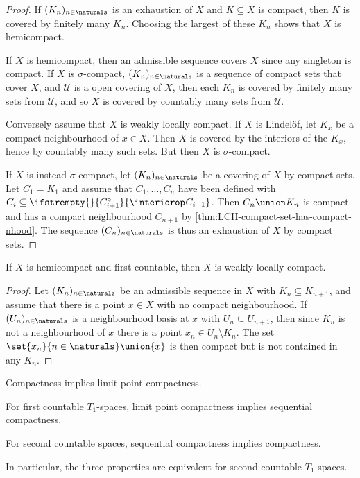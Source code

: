 \documentclass[article, a4paper, 11pt, oneside]{memoir}
\numberwithin{equation}{chapter}
\newcommand{\calU}{\mathcal{U}}
\renewcommand\interior[2][]{%
    \ifstrempty{#1}{%
        #2^{\circ}
    }{%
        \interiorop_{#1}#2
    }%
}
\begin{document}
\begin{proof}
    If $(K_n)_{n \in \naturals}$ is an exhaustion of $X$ and $K \subseteq X$ is compact, then $K$ is covered by finitely many $K_n$. Choosing the largest of these $K_n$ shows that $X$ is hemicompact.

    If $X$ is hemicompact, then an admissible sequence covers $X$ since any singleton is compact. If $X$ is $\sigma$-compact, $(K_n)_{n \in \naturals}$ is a sequence of compact sets that cover $X$, and $\calU$ is a open covering of $X$, then each $K_n$ is covered by finitely many sets from $\calU$, and so $X$ is covered by countably many sets from $\calU$.

    Conversely assume that $X$ is weakly locally compact. If $X$ is Lindelöf, let $K_x$ be a compact neighbourhood of $x \in X$. Then $X$ is covered by the interiors of the $K_x$, hence by countably many such sets. But then $X$ is $\sigma$-compact.

    If $X$ is instead $\sigma$-compact, let $(K_n)_{n \in \naturals}$ be a covering of $X$ by compact sets. Let $C_1 = K_1$ and assume that $C_1, \ldots, C_n$ have been defined with $C_i \subseteq \interior{C_{i+1}}$. Then $C_n \union K_n$ is compact and has a compact neighbourhood $C_{n+1}$ by \cref{thm:LCH-compact-set-has-compact-nhood}. The sequence $(C_n)_{n \in \naturals}$ is thus an exhaustion of $X$ by compact sets.
\end{proof}


\begin{proposition}
    If $X$ is hemicompact and first countable, then $X$ is weakly locally compact.
\end{proposition}

\begin{proof}
    Let $(K_n)_{n \in \naturals}$ be an admissible sequence in $X$ with $K_n \subseteq K_{n+1}$, and assume that there is a point $x \in X$ with no compact neighbourhood. If $(U_n)_{n \in \naturals}$ is a neighbourhood basis at $x$ with $U_n \subseteq U_{n+1}$, then since $K_n$ is not a neighbourhood of $x$ there is a point $x_n \in U_n \setminus K_n$. The set $\set{x_n}{n \in \naturals} \union \{x\}$ is then compact but is not contained in any $K_n$.
\end{proof}


\begin{theorem}
    \begin{enumthm}
        \item Compactness implies limit point compactness.
        \item For first countable $T_1$-spaces, limit point compactness implies sequential compactness.
        \item For second countable spaces, sequential compactness implies compactness.
    \end{enumthm}
    In particular, the three properties are equivalent for second countable $T_1$-spaces.
\end{theorem}
\end{document}
